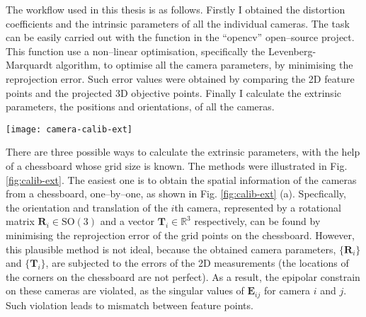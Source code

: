 \documentclass[11pt,twoside]{report}
\begin{document}
The workflow used in this thesis is as follows. Firstly I obtained the distortion coefficients and the intrinsic parameters of all the individual cameras. The task can be easily carried out with the  function in the ``opencv'' open--source project. This function use a non--linear optimisation, specifically the Levenberg-Marquardt algorithm, to optimise all the camera parameters, by minimising the reprojection error. Such error values were obtained by comparing the 2D feature points and the projected 3D objective points. Finally I calculate the extrinsic parameters, the positions and orientations, of all the cameras.

\begin{SCfigure}
  \texttt{[image: camera-calib-ext]}
  \caption{Different ways to get the location ($\bf{T}$) and orientation ($\bf{R}$) of cameras using a chessboard. (a) The cameras obtain their individual $\bf{T}$ and $\bf{R}$ from the chessboard. (b) The chessboard offered the $\bf{T}$ and $\bf{R}$ of camera 1, as well as the essential matrices, $\bf{E}_{21}$ and $\bf{E}_{32}$. The relative translation and orientation of two cameras can be recovered from the essential matrices. (c) The chessboard offered the $\bf{T}$ and $\bf{R}$ of camera 1, as well as the trifocal tensor ($\bf{T}_{123}$). The tensor contain the information about the relative translation and orientation for all cameras.}
  \label{fig:calib-ext}
\end{SCfigure}

There are three possible ways to calculate the extrinsic parameters, with the help of a chessboard whose grid size is known. The methods were illustrated in Fig. \ref{fig:calib-ext}. The easiest one is to obtain the spatial information of the cameras from a chessboard, one--by--one, as shown in Fig. \ref{fig:calib-ext} (a). Specfically, the orientation and translation of the $i$th camera, represented by a rotational matrix $\mathbf{R}_i \in \mathrm{SO}(3)$ and a vector $\mathbf{T}_i \in \mathbb{R}^3$ respectively, can be found by minimising the reprojection error of the grid points on the chessboard. However, this plausible method is not ideal, because the obtained camera parameters, $\{\mathbf{R}_i\}$ and $\{\mathbf{T}_i\}$, are subjected to the errors of the 2D measurements (the locations of the corners on the chessboard are not perfect). As a result, the epipolar constrain on these cameras are violated, as the singular values of $\mathbf{E}_{ij}$ for camera $i$ and $j$. Such violation leads to mismatch between feature points.
\end{document}
